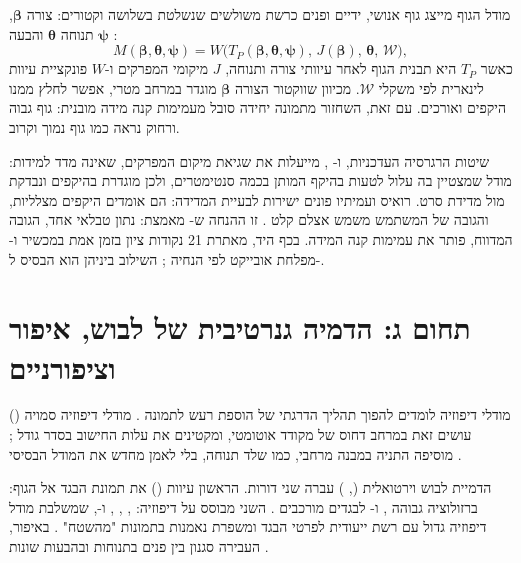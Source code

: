 מודל הגוף  מייצג גוף אנושי, ידיים ופנים כרשת משולשים שנשלטת בשלושה וקטורים: צורה $\boldsymbol{\beta}$, תנוחה $\boldsymbol{\theta}$ והבעה $\boldsymbol{\psi}$ \cite{pavlakos2019smplx}:
\begin{equation}
M(\boldsymbol{\beta},\boldsymbol{\theta},\boldsymbol{\psi}) = W\big(T_P(\boldsymbol{\beta},\boldsymbol{\theta},\boldsymbol{\psi}),\,J(\boldsymbol{\beta}),\,\boldsymbol{\theta},\,\mathcal{W}\big),
\label{eq:smplx}
\end{equation}
כאשר $T_P$ היא תבנית הגוף לאחר עיוותי צורה ותנוחה, $J$ מיקומי המפרקים ו-$W$ פונקציית עיוות לינארית לפי משקלי $\mathcal{W}$. מכיוון שווקטור הצורה $\boldsymbol{\beta}$ מוגדר במרחב מטרי, אפשר לחלץ ממנו היקפים ואורכים. עם זאת, השחזור מתמונה יחידה סובל מעמימות קנה מידה מובנית: גוף גבוה ורחוק נראה כמו גוף נמוך וקרוב.

שיטות הרגרסיה העדכניות,  \cite{goel2023hmr2} ו- \cite{rong2021frankmocap}, מייעלות את שגיאת מיקום המפרקים, שאינה מדד למידות: מודל שמצטיין בה עלול לטעות בהיקף המותן בכמה סנטימטרים, ולכן  מוגדרת בהיקפים ונבדקת מול מדידת סרט. רואיס ועמיתיו פונים ישירות לבעיית המדידה: הם אומדים היקפים מצלליות, והגובה של המשתמש משמש אצלם קלט \cite{ruiz2022bodym}. זו ההנחה ש- מאמצת: נתון טבלאי אחד, הגובה המדווח, פותר את עמימות קנה המידה. בכף היד,  מאתרת \num{21} נקודות ציון בזמן אמת במכשיר \cite{zhang2020mediapipe} ו- מפלחת אובייקט לפי הנחיה \cite{kirillov2023sam}; השילוב ביניהן הוא הבסיס ל-.

\section{תחום ג: הדמיה גנרטיבית של לבוש, איפור וציפורניים}
\label{sec:lit-gen}

מודלי דיפוזיה לומדים להפוך תהליך הדרגתי של הוספת רעש לתמונה \cite{ho2020ddpm}. מודלי דיפוזיה סמויה () עושים זאת במרחב דחוס של מקודד אוטומטי, ומקטינים את עלות החישוב בסדר גודל \cite{rombach2022ldm};  מוסיפה התניה במבנה מרחבי, כמו שלד תנוחה, בלי לאמן מחדש את המודל הבסיסי \cite{zhang2023controlnet}.

הדמיית לבוש וירטואלית (, ) עברה שני דורות. הראשון עיוות () את תמונת הבגד אל הגוף:  ברזולוציה גבוהה \cite{choi2021vitonhd}, ו- לבגדים מורכבים \cite{xie2023gpvton}. השני מבוסס על דיפוזיה:  \cite{morelli2023ladivton},  \cite{kim2024stableviton},  \cite{zhu2023tryondiffusion}, ו-, שמשלבת מודל דיפוזיה גדול עם רשת ייעודית לפרטי הבגד ומשפרת נאמנות בתמונות "מהשטח" \cite{choi2024idmvton}. באיפור,  העבירה סגנון בין פנים בתנוחות ובהבעות שונות \cite{jiang2020psgan}.

